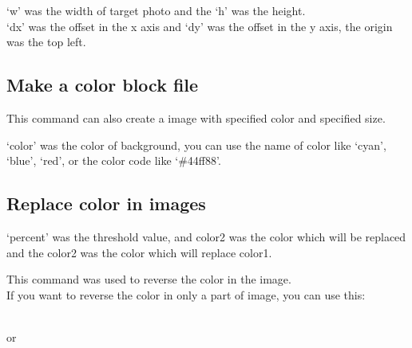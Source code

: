 \documentclass[12pt]{article}
\begin{document}
`w' was the width of target photo and the `h' was the height.\\
`dx' was the offset in the x axis and `dy' was the offset in the y axis, the origin was the top left.

\subsection{Make a color block file}
{\centering{}\par}\vspace{5mm}

This command can also create a image with specified color and specified size.\\

{\centering{}\par}\vspace{5mm}

`color' was the color of background, you can use the name of color like `cyan', `blue', `red', or the color code like `\#44f\mbox{}f88'.

\subsection{Replace color in images}
{\centering{}\par}\vspace{5mm}

`percent' was the threshold value, and color2 was the color which will be replaced and the color2 was the color which will replace color1.\\

{\centering{}\par}\vspace{5mm}

This command was used to reverse the color in the image.\\

If you want to reverse the color in only a part of image, you can use this:\\

{\centering{}\\ \vspace{5mm}
or\\ \vspace{5mm}
\par}\vspace{5mm}
\end{document}

